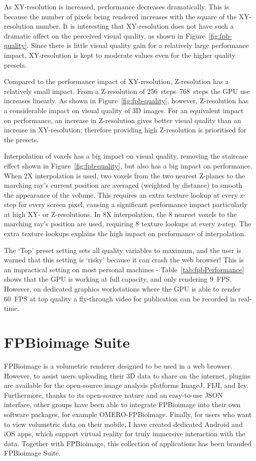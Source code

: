 As XY-resolution is increased, performance decreases dramatically. 
This is because the number of pixels being rendered increases with the square of the XY-resolution number. 
It is interesting that XY-resolution does not have such a dramatic affect on the perceived visual quality, as shown in Figure~\ref{fig:fpb-quality}. 
Since there is little visual quality gain for a relatively large performance impact, XY-resolution is kept to moderate values even for the higher quality presets. 

Compared to the performance impact of XY-resolution, Z-resolution has a relatively small impact. 
From a Z-resolution of \SIrange{256}{768}{steps} the GPU use increases linearly. 
As shown in Figure~\ref{fig:fpb-quality}, however, Z-resolution has a considerable impact on visual quality of 3D images. 
For an equivalent impact on performance, an increase in Z-resolution gives better visual quality than an increase in XY-resolution; therefore providing high Z-resolution is prioritised for the presets. 

Interpolation of voxels has a big impact on visual quality, removing the staircase effect shown in Figure~\ref{fig:fpb-quality}, but also has a big impact on performance. 
When 2X interpolation is used, two voxels from the two nearest Z-planes to the marching ray's current position are averaged (weighted by distance) to smooth the appearance of the volume. 
This requires an extra texture lookup at every z-step for every screen pixel, causing a significant performance impact particularly at high XY- or Z-resolutions. 
In 8X interpolation, the 8 nearest voxels to the marching ray's position are used, requiring 8 texture lookups at every z-step. 
The extra texture lookups explains the high impact on performance of interpolation. 

The `Top' preset setting sets all quality variables to maximum, and the user is warned that this setting is `risky' because it can crash the web browser!
This is an impractical setting on most personal machines - Table~\ref{tab:fpbPerformance} shows that the GPU is working at full capacity, and only rendering \SI{9}{FPS}. 
However, on dedicated graphics workstations where the GPU is able to render \SI{60}{FPS} at top quality a fly-through video for publication can be recorded in real-time. 

\section{FPBioimage Suite}
FPBioimage is a volumetric renderer designed to be used in a web browser. 
However, to assist users uploading their 3D data to share on the internet, plugins are available for the open-source image analysis platforms ImageJ, FIJI, and Icy. 
Furthermore, thanks to its open-source nature and an easy-to-use JSON interface, other groups have been able to integrate FPBioimage into their own software packages, for example OMERO-FPBioimage. 
Finally, for users who want to view volumetric data on their mobile, I have created dedicated Android and iOS apps, which support virtual reality for truly immersive interaction with the data. %
Together with FPBioimage, this collection of applications has been branded FPBioimage Suite.

